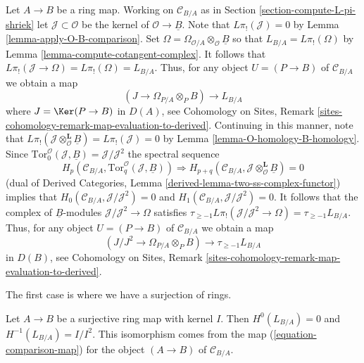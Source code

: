 \begin{remark}
\label{remark-make-map}
Let $A \to B$ be a ring map.  Working on $\mathcal{C}_{B/A}$ as in
Section \ref{section-compute-L-pi-shriek} let
$\mathcal{J} \subset \mathcal{O}$ be the kernel of
$\mathcal{O} \to \underline{B}$. Note that $L\pi_!(\mathcal{J}) = 0$ by
Lemma \ref{lemma-apply-O-B-comparison}. Set
$\Omega =  \Omega_{\mathcal{O}/A} \otimes_\mathcal{O} \underline{B}$
so that
$L_{B/A} = L\pi_!(\Omega)$ by Lemma \ref{lemma-compute-cotangent-complex}.
It follows that $L\pi_!(\mathcal{J} \to \Omega) = L\pi_!(\Omega) = L_{B/A}$.
Thus, for any object $U = (P \to B)$ of $\mathcal{C}_{B/A}$ we obtain a map
\begin{equation}
\label{equation-comparison-map-A}
(J \to \Omega_{P/A} \otimes_P B) \longrightarrow L_{B/A}
\end{equation}
where $J = \Ker(P \to B)$ in $D(A)$, see
Cohomology on Sites, Remark
\ref{sites-cohomology-remark-map-evaluation-to-derived}.
Continuing in this manner, note that
$L\pi_!(\mathcal{J} \otimes_\mathcal{O}^\mathbf{L} \underline{B}) =
L\pi_!(\mathcal{J}) = 0$ by
Lemma \ref{lemma-O-homology-B-homology}.
Since $\text{Tor}_0^\mathcal{O}(\mathcal{J}, \underline{B}) =
\mathcal{J}/\mathcal{J}^2$
the spectral sequence
$$
H_p(\mathcal{C}_{B/A}, \text{Tor}_q^\mathcal{O}(\mathcal{J}, \underline{B}))
\Rightarrow 
H_{p + q}(\mathcal{C}_{B/A},
\mathcal{J} \otimes_\mathcal{O}^\mathbf{L} \underline{B}) = 0
$$
(dual of
Derived Categories, Lemma \ref{derived-lemma-two-ss-complex-functor})
implies that
$H_0(\mathcal{C}_{B/A}, \mathcal{J}/\mathcal{J}^2) = 0$
and $H_1(\mathcal{C}_{B/A}, \mathcal{J}/\mathcal{J}^2) = 0$.
It follows that the complex of $\underline{B}$-modules
$\mathcal{J}/\mathcal{J}^2 \to \Omega$ satisfies
$\tau_{\geq -1}L\pi_!(\mathcal{J}/\mathcal{J}^2 \to \Omega) =
\tau_{\geq -1}L_{B/A}$.
Thus, for any object $U = (P \to B)$ of $\mathcal{C}_{B/A}$ we obtain a map
\begin{equation}
\label{equation-comparison-map}
(J/J^2 \to \Omega_{P/A} \otimes_P B) \longrightarrow \tau_{\geq -1}L_{B/A}
\end{equation}
in $D(B)$, see
Cohomology on Sites, Remark
\ref{sites-cohomology-remark-map-evaluation-to-derived}.
\end{remark}

\noindent
The first case is where we have a surjection of rings.

\begin{lemma}
\label{lemma-surjection}
Let $A \to B$ be a surjective ring map with kernel $I$.
Then $H^0(L_{B/A}) = 0$ and $H^{-1}(L_{B/A}) = I/I^2$.
This isomorphism comes from the map (\ref{equation-comparison-map})
for the object $(A \to B)$ of $\mathcal{C}_{B/A}$.
\end{lemma}

